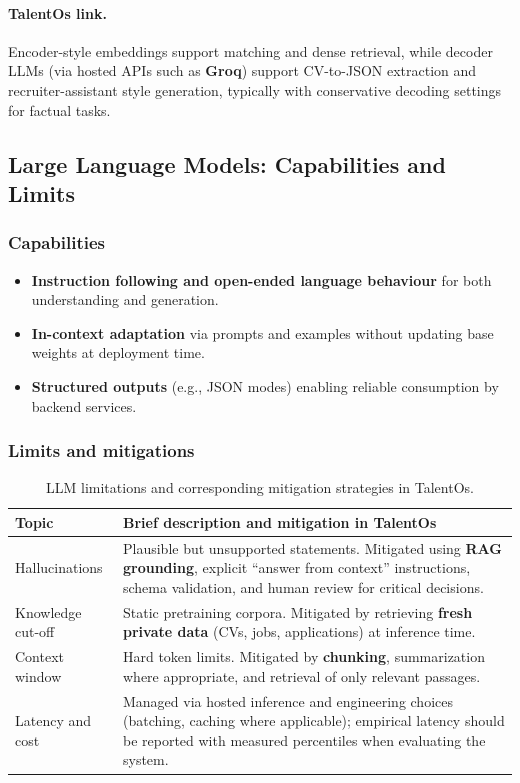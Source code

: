\paragraph{TalentOs link.}
Encoder-style embeddings support matching and dense retrieval, while decoder LLMs (via hosted APIs such as \textbf{Groq}) support CV-to-JSON extraction and recruiter-assistant style generation, typically with conservative decoding settings for factual tasks.

\subsection{Large Language Models: Capabilities and Limits}
\label{sec:ch4:llm_capabilities_limits}

\subsubsection*{Capabilities}

\begin{itemize}
    \item \textbf{Instruction following and open-ended language behaviour} for both understanding and generation.
    \item \textbf{In-context adaptation} via prompts and examples without updating base weights at deployment time.
    \item \textbf{Structured outputs} (e.g., JSON modes) enabling reliable consumption by backend services.
\end{itemize}

\subsubsection*{Limits and mitigations}

\begin{table}[htbp]
\centering
\begin{tabular}{|p{3.2cm}|p{10.8cm}|}
\hline
\textbf{Topic} & \textbf{Brief description and mitigation in TalentOs} \\
\hline
Hallucinations &
Plausible but unsupported statements. Mitigated using \textbf{RAG grounding}, explicit ``answer from context'' instructions, schema validation, and human review for critical decisions. \\
\hline
Knowledge cut-off &
Static pretraining corpora. Mitigated by retrieving \textbf{fresh private data} (CVs, jobs, applications) at inference time. \\
\hline
Context window &
Hard token limits. Mitigated by \textbf{chunking}, summarization where appropriate, and retrieval of only relevant passages. \\
\hline
Latency and cost &
Managed via hosted inference and engineering choices (batching, caching where applicable); empirical latency should be reported with measured percentiles when evaluating the system. \\
\hline
\end{tabular}
\caption{LLM limitations and corresponding mitigation strategies in TalentOs.}
\label{tab:ch4:llm_limits}
\end{table}

